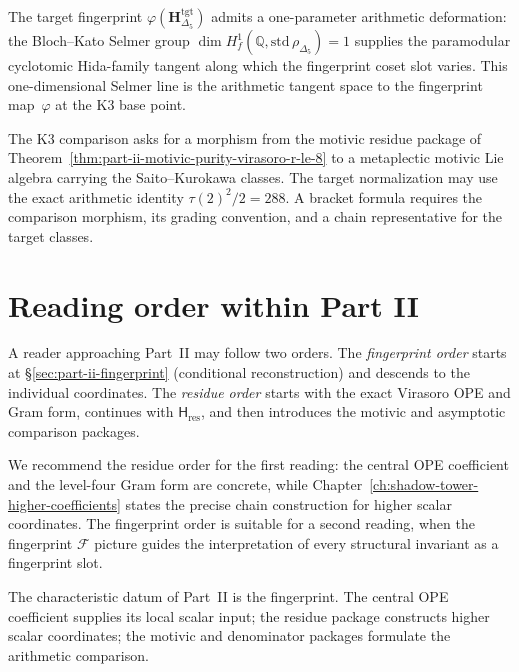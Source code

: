 \begin{remark}
\label{rem:part-ii-selmer-deformation}
The target fingerprint $\varphi(\mathbf H_{\Delta_5}^{\mathrm{tgt}})$ admits a
one-parameter arithmetic deformation: the Bloch--Kato Selmer group
$\dim H^1_f(\mathbb Q,\mathrm{std}\,\rho_{\Delta_5}) = 1$ supplies
the paramodular cyclotomic Hida-family tangent along which the
fingerprint coset slot varies. This one-dimensional Selmer line
is the arithmetic tangent space to the fingerprint map~$\varphi$
at the K3 base point.
\end{remark}

\begin{remark}
\label{rem:part-ii-metaplectic-grt}
The K3 comparison asks for a morphism from the motivic residue package
of Theorem~\ref{thm:part-ii-motivic-purity-virasoro-r-le-8} to a
metaplectic motivic Lie algebra carrying the Saito--Kurokawa classes.
The target normalization may use the exact arithmetic identity
$\tau(2)^2/2=288$.  A bracket formula requires the comparison
morphism, its grading convention, and a chain representative for the
target classes.
\end{remark}

\section{Reading order within Part II}
\label{sec:part-ii-reading-order}

A reader approaching Part~II may follow two orders. The
\emph{fingerprint order} starts at
\S\ref{sec:part-ii-fingerprint} (conditional reconstruction) and descends
to the individual coordinates.  The \emph{residue order} starts with
the exact Virasoro OPE and Gram form, continues with
$\mathsf H_{\mathrm{res}}$, and then introduces the motivic and
asymptotic comparison packages.

We recommend the residue order for the first reading: the central OPE
coefficient and the level-four Gram form are concrete, while
Chapter~\ref{ch:shadow-tower-higher-coefficients} states the precise
chain construction for higher scalar coordinates.  The fingerprint
order is
suitable for a second reading, when the fingerprint $\mathcal{F}$
picture guides the interpretation of every structural invariant as
a fingerprint slot.

\medskip

The characteristic datum of Part~II is the fingerprint.  The central
OPE coefficient supplies its local scalar input; the residue package
constructs higher scalar coordinates; the motivic and denominator
packages formulate the arithmetic comparison.


